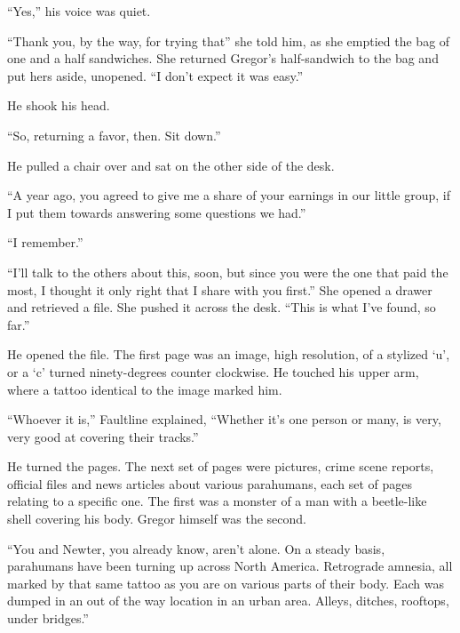 ``Yes,'' his voice was quiet.



``Thank you, by the way, for trying that'' she told him, as she emptied the bag of one and a half sandwiches.  She returned Gregor's half-sandwich to the bag and put hers aside, unopened.  ``I don't expect it was easy.''



He shook his head.



``So, returning a favor, then.  Sit down.''



He pulled a chair over and sat on the other side of the desk.



``A year ago, you agreed to give me a share of your earnings in our little group, if I put them towards answering some questions we had.''



``I remember.''



``I'll talk to the others about this, soon, but since you were the one that paid the most, I thought it only right that I share with you first.''  She opened a drawer and retrieved a file.  She pushed it across the desk.  ``This is what I've found, so far.''



He opened the file.  The first page was an image, high resolution, of a stylized `u', or a `c' turned ninety-degrees counter clockwise.  He touched his upper arm, where a tattoo identical to the image marked him.



``Whoever it is,'' Faultline explained, ``Whether it's one person or many, is very, very good at covering their tracks.''



He turned the pages.  The next set of pages were pictures, crime scene reports, official files and news articles about various parahumans, each set of pages relating to a specific one.  The first was a monster of a man with a beetle-like shell covering his body.  Gregor himself was the second.



``You and Newter, you already know, aren't alone.  On a steady basis, parahumans have been turning up across North America.  Retrograde amnesia, all marked by that same tattoo as you are on various parts of their body.  Each was dumped in an out of the way location in an urban area.  Alleys, ditches, rooftops, under bridges.''



